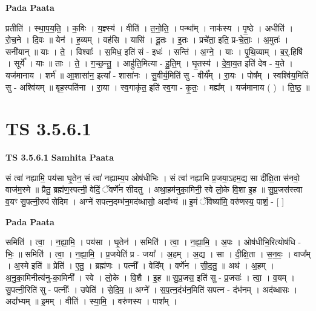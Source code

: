 \documentclass[17pt]{extarticle}
\begin{document}
\textbf{Pada Paata} \newline

प्रतीति॑ । स्था॒प॒य॒ति॒ । क॒विः । य॒ज्ञ्स्य॑ । वीति॑ । त॒नो॒ति॒ । पन्था᳚म् । नाक॑स्य । पृ॒ष्ठे । अधीति॑ । रो॒च॒ने । दि॒वः ॥ येन॑ । ह॒व्यम् । वह॑सि । यासि॑ । दू॒तः । इ॒तः । प्रचे॑ता॒ इति॒ प्र-चे॒ताः॒ । अ॒मुतः॑ । सनी॑यान् ॥ याः । ते॒ । विश्वाः᳚ । स॒मिध॒ इति॑ सं - इधः॑ । सन्ति॑ । अ॒ग्ने॒ । याः । पृ॒थि॒व्याम् । ब॒र्॒.हिषि॑ । सूर्ये᳚ । याः ॥ ताः । ते॒ । ग॒च्छ॒न्तु॒ । आहु॑ति॒मित्या - हु॒ति॒म् । घृ॒तस्य॑ । दे॒वा॒य॒त इति॑ देव - य॒ते । यज॑मानाय । शर्म॑ ॥ आ॒शासा॑न॒ इत्या᳚ - शासा॑नः । सु॒वीर्य॒मिति॑ सु - वीर्य᳚म् । रा॒यः । पोष᳚म् । स्वश्वि॑य॒मिति॑ सु - अश्वि॑यम् ॥ बृह॒स्पति॑ना । रा॒या । स्व॒गाकृ॑त॒ इति॑ स्व॒गा - कृ॒तः॒ । मह्य᳚म् । यज॑मानाय ( ) । ति॒ष्ठ॒ ॥  \newline




\section*{ TS 3.5.6.1 }

\textbf{TS 3.5.6.1 } \newline
\textbf{Samhita Paata} \newline

सं त्वा॑ नह्यामि॒ पय॑सा घृ॒तेन॒ सं त्वा॑ नह्याम्य॒प ओष॑धीभिः । सं त्वा॑ नह्यामि प्र॒जया॒ऽहम॒द्य सा दी᳚क्षि॒ता स॑नवो॒ वाज॑म॒स्मे ॥ प्रैतु॒ ब्रह्म॑ण॒स्पत्नी॒ वेदिं॒ ॅवर्णे॑न सीदतु । अथा॒हम॑नुका॒मिनी॒ स्वे लो॒के वि॒शा इ॒ह ॥ सु॒प्र॒जस॑स्त्वा व॒यꣳ सु॒पत्नी॒रुप॑ सेदिम । अग्ने॑ सपत्न॒दम्भ॑न॒मद॑ब्धासो॒ अदा᳚भ्यं ॥ इ॒मं ॅविष्या॑मि॒ वरु॑णस्य॒ पाशं॒ - [  ] \newline

\textbf{Pada Paata} \newline

समिति॑ । त्वा॒ । न॒ह्या॒मि॒ । पय॑सा । घृ॒तेन॑ । समिति॑ । त्वा॒ । न॒ह्या॒मि॒ । अ॒पः । ओष॑धीभि॒रित्योष॑धि - भिः॒ ॥ समिति॑ । त्वा॒ । न॒ह्या॒मि॒ । प्र॒जयेति॑ प्र - जया᳚ । अ॒हम् । अ॒द्य । सा । दी॒क्षि॒ता । स॒न॒वः॒ । वाज᳚म् । अ॒स्मे इति॑ ॥ प्रेति॑ । ए॒तु॒ । ब्रह्म॑णः । पत्नी᳚ । वेदि᳚म् । वर्णे॑न । सी॒द॒तु॒ ॥ अथ॑ । अ॒हम् । अ॒नु॒का॒मिनीत्य॑नु-का॒मिनी᳚ । स्वे । लो॒के । वि॒शै । इ॒ह ॥ सु॒प्र॒जस॒ इति॑ सु - प्र॒जसः॑ । त्वा॒ । व॒यम् । सु॒पत्नी॒रिति॑ सु - पत्नीः᳚ । उपेति॑ । से॒दि॒म॒ ॥ अग्ने᳚ । स॒प॒त्न॒दंभ॑न॒मिति॑ सपत्न - दंभ॑नम् । अद॑ब्धासः । अदा᳚भ्यम् ॥ इ॒मम् । वीति॑ । स्या॒मि॒ । वरु॑णस्य । पाश᳚म् ।  \newline
\end{document}
